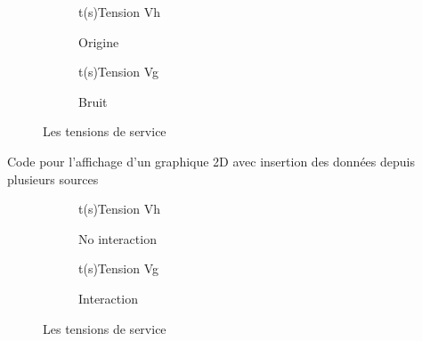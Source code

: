   \begin{figure}[h!]  
    \centering 
      \begin{subfigure}[b]{0.4\linewidth}
        \begin{graphic}{0.8}{1}{0}{1.2}{-1}{5}{t(s)}{Tension V}{h}
          \end{graphic}%
        \caption{Origine} 
      \end{subfigure}
    \begin{subfigure}[b]{0.4\linewidth}
      \begin{graphic}{0.8}{1}{0}{4}{-0.3}{0.3}{t(s)}{Tension V}{g}
        \end{graphic}%
    \caption{Bruit}
    \end{subfigure}
    \caption{Les tensions de service}
    \end{figure}  


  
    \begin{Latex}{Code pour l'affichage d'un graphique 2D avec insertion des données depuis plusieurs sources}

      \begin{figure}[h]  
        \centering 
          \begin{subfigure}[b]{0.4\linewidth}
            \begin{graphic}{0.8}{1}{0}{1.2}{-1}{5}{t(s)}{Tension V}{h}
              \end{graphic}%
            \caption{No interaction} 
          \end{subfigure}
        \begin{subfigure}[b]{0.4\linewidth}
          \begin{graphic}{0.8}{1}{0}{4}{-0.3}{0.3}{t(s)}{Tension V}{g}
            \end{graphic}%
        \caption{Interaction}
        \end{subfigure}
        \caption{Les tensions de service}
        \end{figure}  
    \end{Latex}

    